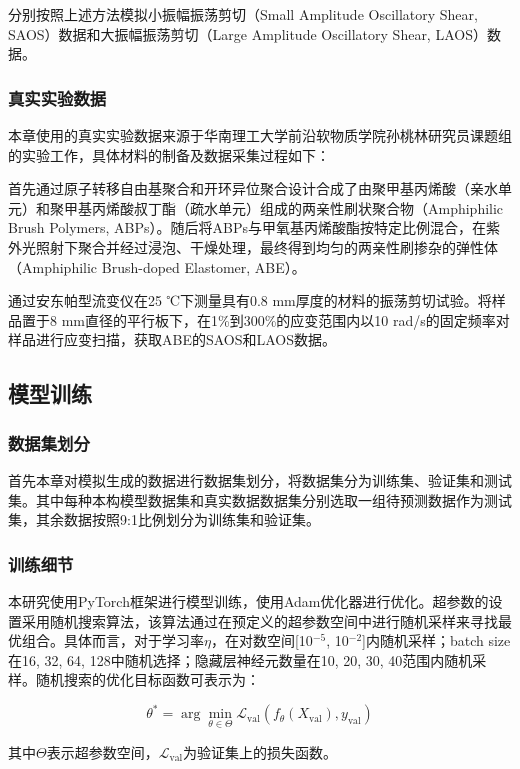 分别按照上述方法模拟小振幅振荡剪切（Small Amplitude Oscillatory Shear, SAOS）数据和大振幅振荡剪切（Large Amplitude Oscillatory Shear, LAOS）数据。
\subsubsection{真实实验数据}
本章使用的真实实验数据来源于华南理工大学前沿软物质学院孙桃林研究员课题组的实验工作，具体材料的制备及数据采集过程如下：

首先通过原子转移自由基聚合和开环异位聚合设计合成了由聚甲基丙烯酸（亲水单元）和聚甲基丙烯酸叔丁酯（疏水单元）组成的两亲性刷状聚合物（Amphiphilic Brush Polymers, ABPs）。随后将ABPs与甲氧基丙烯酸酯按特定比例混合，在紫外光照射下聚合并经过浸泡、干燥处理，最终得到均匀的两亲性刷掺杂的弹性体（Amphiphilic Brush-doped Elastomer, ABE）。

通过安东帕型流变仪在25 ℃下测量具有0.8 mm厚度的材料的振荡剪切试验。将样品置于8 mm直径的平行板下，在1\%到300\%的应变范围内以10 rad/s的固定频率对样品进行应变扫描，获取ABE的SAOS和LAOS数据。
\subsection{模型训练}
\subsubsection{数据集划分}
首先本章对模拟生成的数据进行数据集划分，将数据集分为训练集、验证集和测试集。其中每种本构模型数据集和真实数据数据集分别选取一组待预测数据作为测试集，其余数据按照9:1比例划分为训练集和验证集。

\subsubsection{训练细节} \label{sec:training method}
本研究使用PyTorch框架进行模型训练，使用Adam优化器进行优化。超参数的设置采用随机搜索算法，该算法通过在预定义的超参数空间中进行随机采样来寻找最优组合。具体而言，对于学习率$\eta$，在对数空间[10$^{-5}$, 10$^{-2}$]内随机采样；batch size在{16, 32, 64, 128}中随机选择；隐藏层神经元数量在{10, 20, 30, 40}范围内随机采样。随机搜索的优化目标函数可表示为：

\begin{equation}
  \theta^* = \arg \min_{\theta \in \Theta} \mathcal{L}_{\text{val}}(f_\theta(X_{\text{val}}), y_{\text{val}})
\end{equation}

其中$\Theta$表示超参数空间，$\mathcal{L}_{\text{val}}$为验证集上的损失函数。

